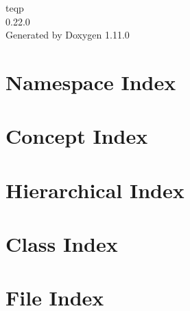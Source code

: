 \documentclass[twoside]{book}
\newcommand{\+}{\discretionary{\mbox{\scriptsize$\hookleftarrow$}}{}{}}
\newcommand{\clearemptydoublepage}{%
    \newpage{\pagestyle{empty}\cleardoublepage}%
  }
\begin{document}
  \raggedbottom
    \hypersetup{pageanchor=false,
                bookmarksnumbered=true,
                pdfencoding=unicode
               }
  \begin{titlepage}
  \vspace*{7cm}
  \begin{center}%
  {\Large teqp}\\
  [1ex]\large 0.\+22.\+0 \\
  \vspace*{1cm}
  {\large Generated by Doxygen 1.11.0}\\
  \end{center}
  \end{titlepage}
  \clearemptydoublepage
  \tableofcontents
  \clearemptydoublepage
  \hypersetup{pageanchor=true}
\chapter{Namespace Index}

\chapter{Concept Index}

\chapter{Hierarchical Index}

\chapter{Class Index}

\chapter{File Index}

\end{document}
